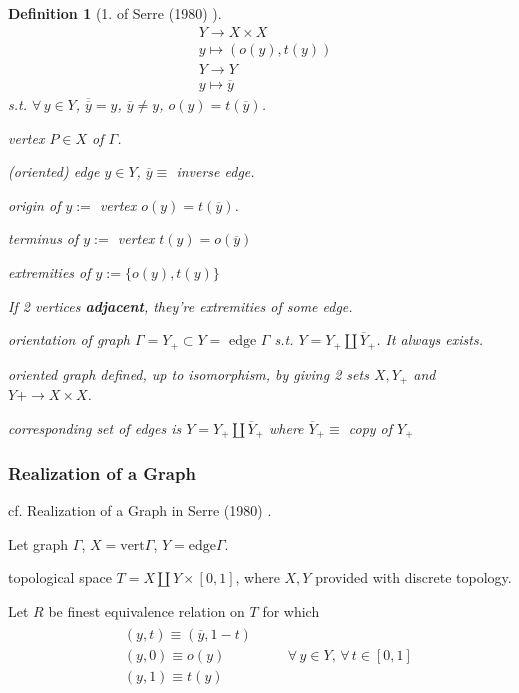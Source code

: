 \documentclass[10pt]{amsart}
\newtheorem{definition}{Definition}
\begin{document}
\begin{multicols*}{2}
\begin{definition}[1. of Serre (1980) \cite{Serr1980}]
\[
\begin{aligned}
& Y \to X\times X \\ 
& y\mapsto (o(y), t(y)) \\
& Y\to Y \\
& y\mapsto \overline{y}
\end{aligned}
\]
s.t. $\forall \, y \in Y$, $\overline{ \overline{y}} = y$, $\overline{y} \neq y$, $o(y) = t(\overline{y})$.  

vertex $P \in X$ of $\Gamma$. 

(oriented) edge $y\in Y$, $\overline{y} \equiv $ inverse edge.  

origin of $y := $ vertex $o(y) = t(\overline{y})$.  

terminus of $y:= $ vertex $t(y) = o(\overline{y})$   

extremities of $y:= \lbrace o(y),t(y)\rbrace$  

If 2 vertices \textbf{adjacent}, they're extremities of some edge.  

orientation of graph $\Gamma = Y_+ \subset Y = \text{ edge } \Gamma$ s.t. $Y = Y_+ \coprod \overline{Y}_+$.  It always exists.  

oriented graph defined, up to isomorphism, by giving 2 sets $X,Y_+$ and $Y+ \to X\times X$.  
	
	corresponding set of edges is $Y = Y_+\coprod \overline{Y}_+$ where $\overline{Y}_+ \equiv $ copy of $Y_+$  
\end{definition}

\subsubsection{Realization of a Graph}

cf. Realization of a Graph in Serre (1980) \cite{Serr1980}.  

Let graph $\Gamma$, $X = \text{vert}\Gamma$, $Y = \text{edge}\Gamma$.

topological space $T = X \coprod Y \times [0,1]$, where $X,Y$ provided with discrete topology.  

Let $R$ be finest equivalence relation on $T$ for which 
\begin{equation}
\begin{gathered} \begin{aligned}
	& (y,t) \equiv (\overline{y}, 1-t) \\ 
	& (y,0) \equiv o(y) \\
	& (y,1) \equiv t(y)
\end{aligned} \qquad \, \forall \, y \in Y, \, \forall \, t \in [0,1]
\end{gathered}
\end{equation}


\end{multicols*}
\end{document}
